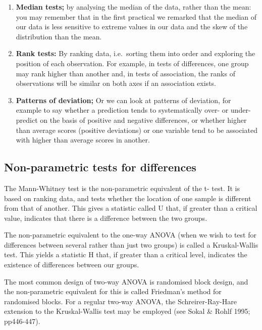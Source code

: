\documentclass[
]{book}
\providecommand{\tightlist}{%
  \setlength{\itemsep}{0pt}\setlength{\parskip}{0pt}}
\begin{document}
\begin{enumerate}
\def\labelenumi{\arabic{enumi})}
\tightlist
\item
  \textbf{Median tests;} by analysing the median of the data, rather than the mean: you may remember that in the first practical we remarked that the median of our data is less sensitive to extreme values in our data and the skew of the distribution than the mean.
\item
  \textbf{Rank tests:} By ranking data, i.e.~sorting them into order and exploring the position of each observation. For example, in tests of differences, one group may rank higher than another and, in tests of association, the ranks of observations will be similar on both axes if an association exists.
\item
  \textbf{Patterns of deviation;} Or we can look at patterns of deviation, for example to say whether a prediction tends to systematically over- or under- predict on the basis of positive and negative differences, or whether higher than average scores (positive deviations) or one variable tend to be associated with higher than average scores in another.
\end{enumerate}

\hypertarget{non-parametric-tests-for-differences}{%
\subsection*{Non-parametric tests for differences}\label{non-parametric-tests-for-differences}}

The Mann-Whitney test is the non-parametric equivalent of the t- test. It is based on ranking data, and tests whether the location of one sample is different from that of another. This gives a statistic called U that, if greater than a critical value, indicates that there is a difference between the two groups.

The non-parametric equivalent to the one-way ANOVA (when we wish to test for differences between several rather than just two groups) is called a Kruskal-Wallis test. This yields a statistic H that, if greater than a critical level, indicates the existence of differences between our groups.

The most common design of two-way ANOVA is randomised block design, and the non-parametric equivalent for this is called Friedman's method for randomised blocks. For a regular two-way ANOVA, the Schreirer-Ray-Hare extension to the Kruskal-Wallis test may be employed (see Sokal \& Rohlf 1995; pp446-447).
\end{document}
